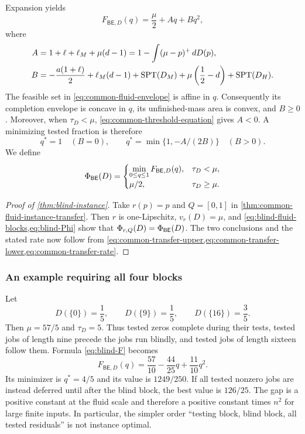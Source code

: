 Expansion yields
\begin{equation}
 F_{\mathsf{BE},D}(q)=\frac\mu2+Aq+Bq^2,
 \label{eq:blind-quadratic}
\end{equation}
where
\begin{align}
 A&=1+\ell+\ell_M+\mu(d-1)
   =1-\int(\mu-p)^+\,dD(p),
 \label{eq:blind-A}\\
 B&=-\frac{a(1+\ell)}2+\ell_M(d-1)+\operatorname{SPT}(D_M)
   +\mu\left(\frac12-d\right)+\operatorname{SPT}(D_H).
 \label{eq:blind-B}
\end{align}
The feasible set in \cref{eq:common-fluid-envelope} is affine in $q$.
Consequently its completion envelope is concave in $q$, its unfinished-mass
area is convex, and $B\ge0$.  Moreover, when $\tau_D<\mu$,
\cref{eq:common-threshold-equation} gives $A<0$.  A minimizing tested
fraction is therefore
\begin{equation}
 q^*=1\quad(B=0),
 \qquad
 q^*=\min\{1,-A/(2B)\}\quad(B>0).
 \label{eq:blind-qstar}
\end{equation}
We define
\begin{equation}
 \Phi_{\mathsf{BE}}(D)=
 \begin{cases}
  \displaystyle\min_{0\le q\le1}F_{\mathsf{BE},D}(q),&\tau_D<\mu,\\[3pt]
  \mu/2,&\tau_D\ge\mu.
 \end{cases}
 \label{eq:blind-Phi}
\end{equation}

\begin{proof}[Proof of \cref{thm:blind-instance}]
Take $r(p)=p$ and $Q=[0,1]$ in
\cref{thm:common-fluid-instance-transfer}.  Then $r$ is one-Lipschitz,
$v_r(D)=\mu$, and \cref{eq:blind-fluid-blocks,eq:blind-Phi} show that
$\Phi_{r,Q}(D)=\Phi_{\mathsf{BE}}(D)$.  The two conclusions and
the stated rate now follow from
\cref{eq:common-transfer-upper,eq:common-transfer-lower,eq:common-transfer-rate}.
\end{proof}

\subsubsection{An example requiring all four blocks}

Let
\[
 D(\{0\})=\frac15,\qquad
 D(\{9\})=\frac15,\qquad
 D(\{16\})=\frac35.
\]
Then $\mu=57/5$ and $\tau_D=5$.  Thus tested zeros complete during their
tests, tested jobs of length nine precede the jobs run blindly, and tested
jobs of length sixteen follow them.  Formula \cref{eq:blind-F} becomes
\[
 F_{\mathsf{BE},D}(q)=\frac{57}{10}-\frac{44}{25}q+\frac{11}{10}q^2.
\]
Its minimizer is $q^*=4/5$ and its value is $1249/250$.  If all tested nonzero
jobs are instead deferred until after the blind block, the best value is
$126/25$.  The gap is a positive constant at the fluid scale and therefore a
positive constant times $n^2$ for large finite inputs.  In particular, the
simpler order ``testing block, blind block, all tested residuals'' is not
instance optimal.

